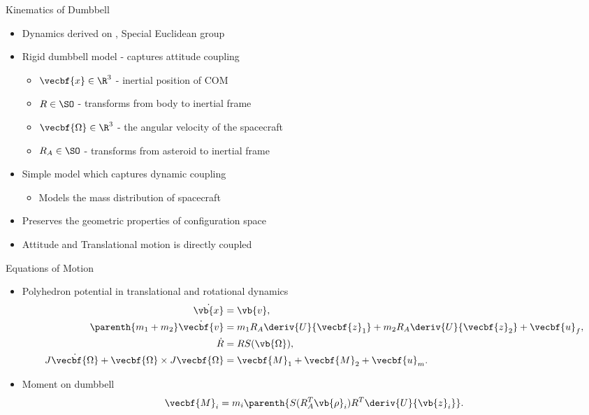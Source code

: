 \documentclass[11pt,professionalfonts]{beamer}
\begin{document}
\begin{frame}{Kinematics of Dumbbell}
    \begin{itemize}
        \item Dynamics derived on \SE, Special Euclidean group
        \item Rigid dumbbell model - captures attitude coupling
        \pause
        \begin{itemize}
            \item \( \vecbf{x} \in \R^3 \) - inertial position of COM
            \item \( R \in \SO\) - transforms from body to inertial frame
            \item \( \vecbf{\Omega} \in \R^3 \) - the angular velocity of the spacecraft 
            \item \( R_A \in \SO \) - transforms from asteroid to inertial frame
        \end{itemize}    
        \pause
    \item Simple model which captures dynamic coupling  
        \begin{itemize}
            \item Models the mass distribution of spacecraft 
        \end{itemize}
        \pause
    \item Preserves the geometric properties of configuration space
    \item Attitude and Translational motion is directly coupled
\end{itemize}

\end{frame}

\begin{frame}{Equations of Motion}

    \begin{itemize}
        \item Polyhedron potential in translational and rotational dynamics
        \begin{align*}
            \dot{\vb{x}} &= \vb{v}, \\
            \parenth{m_1 + m_2} \dot{\vecbf{v}} &= m_1 R_A \deriv{U}{\vecbf{z}_1} + m_2 R_A \deriv{U}{\vecbf{z}_2} + \vecbf{u}_f, \\
            \dot{R} &= R S(\vb{\Omega}) , \\
            J \dot{\vecbf{\Omega}} + \vecbf{\Omega} \times J \vecbf{\Omega} &= \vecbf{M}_1 + \vecbf{M}_2 + \vecbf{u}_m. 
        \end{align*}
    \item Moment on dumbbell
        \begin{align*}
            \vecbf{M}_i = m_i \parenth{S(R_A^T \vb{\rho}_i) R^T \deriv{U}{\vb{z}_i}}.
        \end{align*}
    \end{itemize}
\end{frame}
\end{document}
